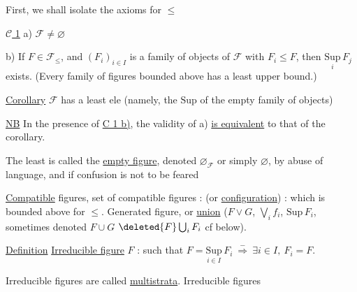 
First, we shall isolate the axioms for $\leq$

\uline{$\mathcal C$ 1} a) $\mathcal F\ne\varnothing$

 b) If $F\in\mathcal F_{\leq}$, and $(F_i)_{i\in I}$ is a family of objects of $\mathcal F$ with $F_i\leq F$, then $\underset{i}{\mathrm{Sup}}\,F_j$ exists. (Every family of figures bounded above has a least upper bound.)

\uline{Corollary} $\mathcal F$ has a least ele (namely, the $\mathrm{Sup}$ of the empty family of objects)

\uline{NB} In the presence of  \uline{C 1 b)}, the validity of a) \uline{is equivalent} to that of the corollary.

The least  is called the \uline{empty figure}, denoted $\varnothing_{\mathcal F}$ or simply $\varnothing$, by abuse of language, and if confusion is not to be feared


\uline{Compatible} figures, set of  compatible figures :   (or \uline{configuration}) : which is bounded above for $\leq$.  Generated figure, or \uline{union} ($F\vee G$, $\bigvee_i f_i$, $\mathrm{Sup}\,F_i$, sometimes denoted $F\cup G$  $\deleted{F}\bigcup_iF_i$ cf below).

\uline{Definition} \uline{Irreducible figure} $F$ : such that $\displaystyle F=\underset{i\in I}{\mathrm{Sup}}\,F_i\ \overset{-}{\Longrightarrow}\ \exists i\in I,\ F_i=F$.

 Irreducible figures are called \uline{multistrata}.  Irreducible figures
